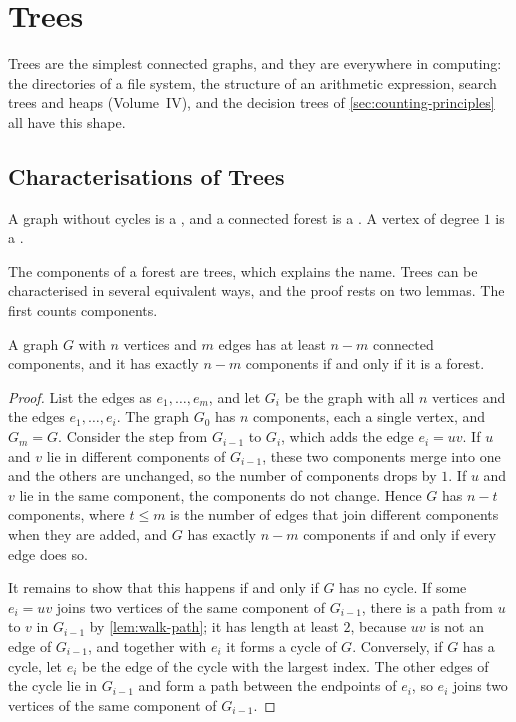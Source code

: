 \section{Trees}
\label{sec:trees}

Trees are the simplest connected graphs, and they are everywhere in computing: the directories of a file system, the structure of an arithmetic expression, search trees and heaps (Volume~IV), and the decision trees of \cref{sec:counting-principles} all have this shape.

\subsection{Characterisations of Trees}

\begin{definition}
\label{def:tree}
A graph without cycles is a , and a connected forest is a . A vertex of degree $1$ is a .
\end{definition}

The components of a forest are trees, which explains the name. Trees can be characterised in several equivalent ways, and the proof rests on two lemmas. The first counts components.

\begin{lemma}
\label{lem:components-edges}
A graph $G$ with $n$ vertices and $m$ edges has at least $n-m$ connected components, and it has exactly $n-m$ components if and only if it is a forest.
\end{lemma}

\begin{proof}
List the edges as $e_1,\ldots,e_m$, and let $G_i$ be the graph with all $n$ vertices and the edges $e_1,\ldots,e_i$. The graph $G_0$ has $n$ components, each a single vertex, and $G_m=G$. Consider the step from $G_{i-1}$ to $G_i$, which adds the edge $e_i=uv$. If $u$ and $v$ lie in different components of $G_{i-1}$, these two components merge into one and the others are unchanged, so the number of components drops by $1$. If $u$ and $v$ lie in the same component, the components do not change. Hence $G$ has $n-t$ components, where $t\le m$ is the number of edges that join different components when they are added, and $G$ has exactly $n-m$ components if and only if every edge does so.

It remains to show that this happens if and only if $G$ has no cycle. If some $e_i=uv$ joins two vertices of the same component of $G_{i-1}$, there is a path from $u$ to $v$ in $G_{i-1}$ by \cref{lem:walk-path}; it has length at least $2$, because $uv$ is not an edge of $G_{i-1}$, and together with $e_i$ it forms a cycle of $G$. Conversely, if $G$ has a cycle, let $e_i$ be the edge of the cycle with the largest index. The other edges of the cycle lie in $G_{i-1}$ and form a path between the endpoints of $e_i$, so $e_i$ joins two vertices of the same component of $G_{i-1}$.
\end{proof}

